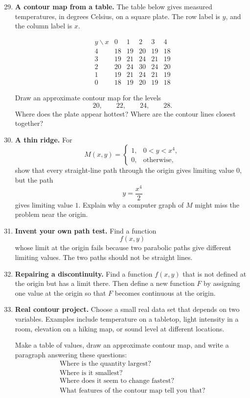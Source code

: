 \begin{enumerate}
\setcounter{enumi}{28}

\item \textbf{A contour map from a table.}
The table below gives measured temperatures, in degrees Celsius, on a square plate.
The row label is \(y\), and the column label is \(x\).

\[
\begin{array}{c|ccccc}
y\backslash x & 0 & 1 & 2 & 3 & 4 \\ \hline
4 & 18 & 19 & 20 & 19 & 18\\
3 & 19 & 21 & 24 & 21 & 19\\
2 & 20 & 24 & 30 & 24 & 20\\
1 & 19 & 21 & 24 & 21 & 19\\
0 & 18 & 19 & 20 & 19 & 18
\end{array}
\]

Draw an approximate contour map for the levels
\[
    20,\qquad 22,\qquad 24,\qquad 28.
\]
Where does the plate appear hottest?  Where are the contour lines closest together?

\item \textbf{A thin ridge.}
For
\[
    M(x,y)=
    \begin{cases}
    1, & 0<y<x^4,\\
    0, & \text{otherwise},
    \end{cases}
\]
show that every straight-line path through the origin gives limiting value \(0\),
but the path
\[
    y=\frac{x^4}{2}
\]
gives limiting value \(1\).  Explain why a computer graph of \(M\) might miss the
problem near the origin.

\item \textbf{Invent your own path test.}
Find a function
\[
    f(x,y)
\]
whose limit at the origin fails because two parabolic paths give different limiting
values.  The two paths should not be straight lines.

\item \textbf{Repairing a discontinuity.}
Find a function \(f(x,y)\) that is not defined at the origin but has a limit there.
Then define a new function \(F\) by assigning one value at the origin so that \(F\)
becomes continuous at the origin.

\item \textbf{Real contour project.}
Choose a small real data set that depends on two variables.  Examples include
temperature on a tabletop, light intensity in a room, elevation on a hiking map, or
sound level at different locations.

Make a table of values, draw an approximate contour map, and write a paragraph
answering these questions:
\[
\begin{array}{l}
\text{Where is the quantity largest?}\\
\text{Where is it smallest?}\\
\text{Where does it seem to change fastest?}\\
\text{What features of the contour map tell you that?}
\end{array}
\]
\end{enumerate}

